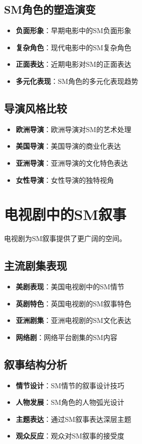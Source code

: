 \documentclass[12pt,UTF8]{ctexbook}
\begin{document}
\subsection{SM角色的塑造演变}
\begin{itemize}[leftmargin=2cm]
	\item \textbf{负面形象}：早期电影中的SM负面形象
	\item \textbf{复杂角色}：现代电影中的SM复杂角色
	\item \textbf{正面表达}：近期电影对SM的正面表达
	\item \textbf{多元化表现}：SM角色的多元化表现趋势
\end{itemize}

\subsection{导演风格比较}
\begin{itemize}[leftmargin=2cm]
	\item \textbf{欧洲导演}：欧洲导演对SM的艺术处理
	\item \textbf{美国导演}：美国导演的商业化表达
	\item \textbf{亚洲导演}：亚洲导演的文化特色表达
	\item \textbf{女性导演}：女性导演的独特视角
\end{itemize}

\section{电视剧中的SM叙事}
电视剧为SM叙事提供了更广阔的空间。

\subsection{主流剧集表现}
\begin{itemize}[leftmargin=2cm]
	\item \textbf{美剧表现}：美国电视剧中的SM情节
	\item \textbf{英剧特色}：英国电视剧的SM叙事特色
	\item \textbf{亚洲剧集}：亚洲电视剧的SM文化表达
	\item \textbf{网络剧}：网络平台剧集的SM内容
\end{itemize}

\subsection{叙事结构分析}
\begin{itemize}[leftmargin=2cm]
	\item \textbf{情节设计}：SM情节的叙事设计技巧
	\item \textbf{人物发展}：SM角色的人物弧光设计
	\item \textbf{主题表达}：通过SM叙事表达深层主题
	\item \textbf{观众反应}：观众对SM叙事的接受度
\end{itemize}
\end{document}
